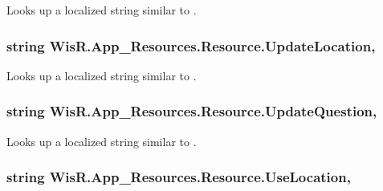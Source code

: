 Looks up a localized string similar to . 

\hypertarget{class_wis_r_1_1_app___resources_1_1_resource_a35d7cbe89630bfad2fa08e5d0b87e3de}{}
\subsubsection[{Update\+Location}]{\setlength{\rightskip}{0pt plus 5cm}string Wis\+R.\+App\+\_\+\+Resources.\+Resource.\+Update\+Location\hspace{0.3cm}{\ttfamily [static]}, {\ttfamily [get]}}\label{class_wis_r_1_1_app___resources_1_1_resource_a35d7cbe89630bfad2fa08e5d0b87e3de}


Looks up a localized string similar to . 

\hypertarget{class_wis_r_1_1_app___resources_1_1_resource_ab7293685754c9220bf3d8bc4809c57e0}{}
\subsubsection[{Update\+Question}]{\setlength{\rightskip}{0pt plus 5cm}string Wis\+R.\+App\+\_\+\+Resources.\+Resource.\+Update\+Question\hspace{0.3cm}{\ttfamily [static]}, {\ttfamily [get]}}\label{class_wis_r_1_1_app___resources_1_1_resource_ab7293685754c9220bf3d8bc4809c57e0}


Looks up a localized string similar to . 

\hypertarget{class_wis_r_1_1_app___resources_1_1_resource_a2b3d86803393d80bdfa3f6f0a3f5655d}{}
\subsubsection[{Use\+Location}]{\setlength{\rightskip}{0pt plus 5cm}string Wis\+R.\+App\+\_\+\+Resources.\+Resource.\+Use\+Location\hspace{0.3cm}{\ttfamily [static]}, {\ttfamily [get]}}\label{class_wis_r_1_1_app___resources_1_1_resource_a2b3d86803393d80bdfa3f6f0a3f5655d}


